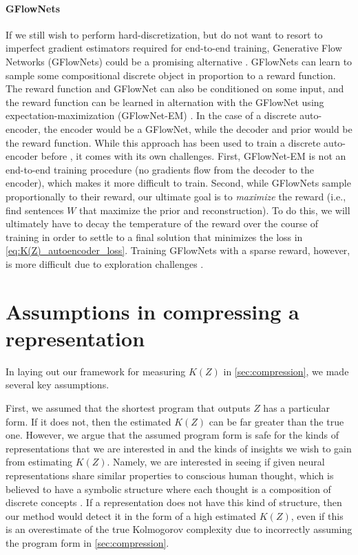 \documentclass{article}
\begin{document}
\begin{appendices}
\paragraph{GFlowNets}

If we still wish to perform hard-discretization, but do not want to resort to imperfect gradient estimators required for end-to-end training, Generative Flow Networks (GFlowNets) could be a promising alternative \citep{bengio2021flow,bengio2023gflownet}. GFlowNets can learn to sample some compositional discrete object in proportion to a reward function. The reward function and GFlowNet can also be conditioned on some input, and the reward function can be learned in alternation with the GFlowNet using expectation-maximization (GFlowNet-EM) \citep{hu2023gflownet}. In the case of a discrete auto-encoder, the encoder would be a GFlowNet, while the decoder and prior would be the reward function. While this approach has been used to train a discrete auto-encoder before \citep{hu2023gflownet}, it comes with its own challenges. First, GFlowNet-EM is not an end-to-end training procedure (no gradients flow from the decoder to the encoder), which makes it more difficult to train. Second, while GFlowNets sample proportionally to their reward, our ultimate goal is to \emph{maximize} the reward (i.e., find sentences $W$ that maximize the prior and reconstruction). To do this, we will ultimately have to decay the temperature of the reward over the course of training in order to settle to a final solution that minimizes the loss in \cref{eq:K(Z)_autoencoder_loss}. Training GFlowNets with a sparse reward, however, is more difficult due to exploration challenges \citep{atanackovic2024investigating}.


\section{Assumptions in compressing a representation}
\label{sec:K(Z)_assumptions}

In laying out our framework for measuring $K(Z)$ in \cref{sec:compression}, we made several key assumptions.

First, we assumed that the shortest program that outputs $Z$ has a particular form. If it does not, then the estimated $K(Z)$ can be far greater than the true one. However, we argue that the assumed program form is safe for the kinds of representations that we are interested in and the kinds of insights we wish to gain from estimating $K(Z)$. Namely, we are interested in seeing if given neural representations share similar properties to conscious human thought, which is believed to have a symbolic structure where each thought is a composition of discrete concepts \citep{fodor1975language}. If a representation does not have this kind of structure, then our method would detect it in the form of a high estimated $K(Z)$, even if this is an overestimate of the true Kolmogorov complexity due to incorrectly assuming the program form in \cref{sec:compression}.


\end{appendices}
\end{document}
